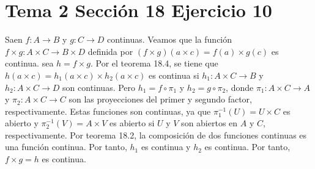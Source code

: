 \documentclass{article}
\begin{document}
\section{Tema 2 Sección 18 Ejercicio 10}
Saen $f:A\rightarrow B$ y $g:C\rightarrow D$ continuas. Veamos que la función $f\times g:A\times C\rightarrow B\times D$ definida por $(f\times g)(a\times c)=f(a)\times g(c)$ es continua.
sea $h=f\times g$. Por el teorema 18.4, se tiene que $h(a\times c)=h_1(a\times c)\times h_2(a\times c)$ es continua si $h_1:A\times C\rightarrow B$ y $h_2:A\times C\rightarrow D$ son continuas. Pero $h_1=f\circ \pi_1$ y $h_2=g\circ \pi_2$, donde $\pi_1: A\times C \rightarrow A$ y $\pi_2: A\times C \rightarrow C$ son las proyecciones del primer y segundo factor, respectivamente. Estas funciones son continuas, ya que $\pi_1^{-1}(U)=U\times C$ es abierto y $\pi_2^{-1}(V)=A\times V$ es abierto si $U$ y $V$ son abiertos en $A$ y $C$, respectivamente. Por teorema 18.2, la composición de dos funciones continuas es una función continua. Por tanto, $h_1$ es continua y $h_2$ es continua. Por tanto, $f\times g=h$ es continua.
\end{document}
